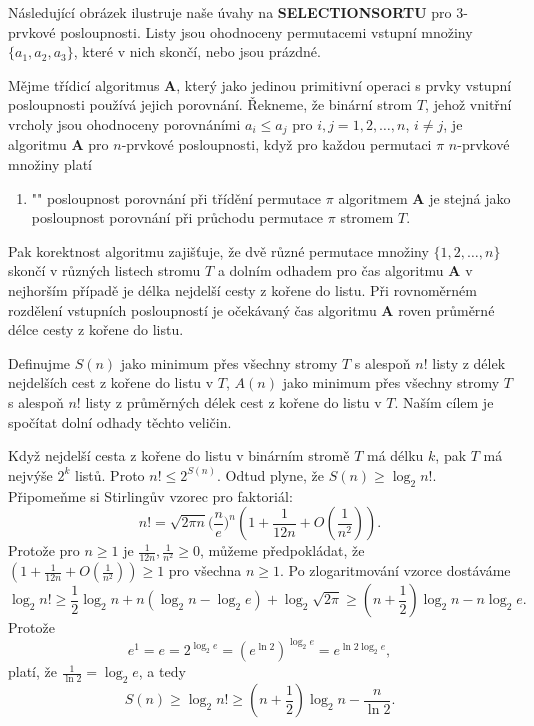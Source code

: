 \documentclass[a4paper,12pt]{article}
\def \emph#1{\underbar{#1}}
\begin{document}
Následující obrázek ilustruje naše úvahy na 
{\bf SELECTIONSORTU} pro $3$-prvkové posloupnosti. Listy jsou 
ohodnoceny permutacemi vstupní množiny 
$\{a_1,a_2,a_3\}$, které v nich 
skončí, nebo jsou prázdné. 
\midinsert
\centerline{}
\endcaption
\endinsert

Mějme třídicí algoritmus {\bf A}, který 
jako jedinou pri\-mitivní operaci s prvky vstupní 
posloupnosti používá jejich porov\-nání. \v Rekneme, že binární 
strom $T$, jehož vnitřní vrcholy jsou ohodnoceny 
porovnáními  $a_i\le a_j$ pro $i,j=1,2,\dots,n$, $i\ne j$, je 
\emph{rozhodovacím} \emph{stromem} algoritmu {\bf A} pro 
$n$-prvkové posloupnosti, když pro každou permutaci $\pi$
$n$-prvkové množiny platí 
\begin{enumerate}
\item"{}"
posloupnost porovnání při třídění permutace $
\pi$ 
algoritmem {\bf A} je stejná jako po\-sloupnost porovnání při 
průchodu permutace $\pi$ stromem $T$.
\end{enumerate}
\enddefinition

Pak korektnost algoritmu zajišťuje, že dvě různé 
permutace množiny $\{1,2,\dots,n\}$ skončí v 
různých listech stromu $T$ a dol\-ním odhadem pro 
čas algoritmu {\bf A} v nej\-horším případě je délka nejdelší 
cesty z kořene do listu.  
Při rovnoměrném 
rozdělení vstupních po\-sloupností je očekávaný čas 
algoritmu {\bf A} roven průměrné délce cesty z kořene do 
listu.  

Definujme\newline 
$S(n)$ jako minimum přes všechny stromy $T$ s alespoň $n
!$ listy z 
délek nejdelších cest z kořene 
do listu v $T$, \newline 
$A(n)$ jako minimum přes všechny stromy $T$ s alespoň $n
!$ listy z
průměrných délek cest z kořene do listu v $T$.\newline 
Naším cílem je spočítat dolní odhady těchto veličin.

Když nejdelší cesta z kořene do listu v 
binárním stromě $T$ má délku $k$, pak $T$ má nejvýše $
2^k$ 
listů. Proto $n!\le 2^{S(n)}$. Odtud plyne, že $S(n)\ge\log_
2n!$.
Připomeňme si Stirlingův vzorec pro faktoriál: 
$$n!=\sqrt {2\pi n}\big(\frac ne\big)^n(1+\frac 1{12n}+O(\frac 1{
n^2})).$$
Protože pro $n\ge 1$ je $\frac 1{12n},\frac 1{n^2}\ge 0$, můžeme 
předpokládat, že $(1+\frac 1{12n}+O(\frac 1{n^2}))\ge 1$ pro všechna $
n\ge 1$. Po 
zlogaritmování vzorce dostáváme 
$$\log_2n!\ge\frac 12\log_2n+n(\log_2n-\log_2e)+\log_2\sqrt {2\pi}
\ge (n+\frac 12)\log_2n-n\log_2e.$$
Protože  
$$e^1=e=2^{\log_2e}=(e^{\ln2})^{\log_2e}=e^{\ln2\log_2e},$$
platí, že $\frac 1{\ln2}=\log_2e$, a tedy  
$$S(n)\ge\log_2n!\ge (n+\frac 12)\log_2n-\frac n{\ln2}.$$
\end{document}
